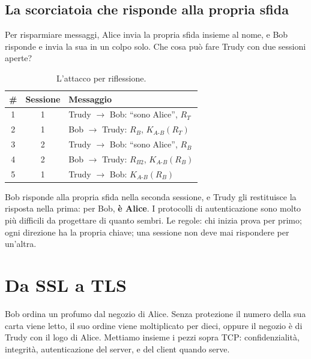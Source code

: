 
\subsection{La scorciatoia che risponde alla propria sfida}

Per risparmiare messaggi, Alice invia la propria sfida insieme al nome, e Bob risponde e invia la sua in un colpo solo. Che cosa può fare
Trudy con due sessioni aperte?

\begin{table}[H]
\centering
\begin{tabular}{ccl}
\toprule
\textbf{\#} & \textbf{Sessione} & \textbf{Messaggio} \\
\midrule
1 & 1 & Trudy $\rightarrow$ Bob: ``sono Alice'', $R_T$ \\
2 & 1 & Bob $\rightarrow$ Trudy: $R_B$, $K_{A\text{-}B}(R_T)$ \\
3 & 2 & Trudy $\rightarrow$ Bob: ``sono Alice'', $R_B$ \\
4 & 2 & Bob $\rightarrow$ Trudy: $R_{B2}$, $K_{A\text{-}B}(R_B)$ \\
5 & 1 & Trudy $\rightarrow$ Bob: $K_{A\text{-}B}(R_B)$ \\
\bottomrule
\end{tabular}
\caption{L'attacco per riflessione.}
\end{table}

Bob risponde alla propria sfida nella seconda sessione, e Trudy gli restituisce la risposta nella prima: per Bob, \textbf{è Alice}. I
protocolli di autenticazione sono molto più difficili da progettare di quanto sembri. Le regole: chi inizia prova per primo; ogni
direzione ha la propria chiave; una sessione non deve mai rispondere per un'altra.

\section{Da SSL a TLS}

Bob ordina un profumo dal negozio di Alice. Senza protezione il numero della sua carta viene letto, il suo ordine viene moltiplicato
per dieci, oppure il negozio è di Trudy con il logo di Alice. Mettiamo insieme i pezzi sopra TCP: confidenzialità, integrità,
autenticazione del server, e del client quando serve.

